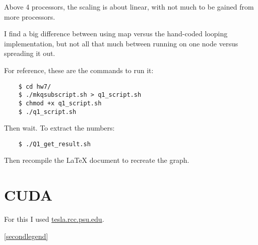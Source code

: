 \documentclass[11pt]{article}
\begin{document}
Above 4 processors, the scaling is about linear, with not much to be gained
from more processors.

I find a big difference between using map versus the hand-coded looping
implementation, but not all that much between running on one node versus
spreading it out.

For reference, these are the commands to run it:
\begin{center}
\begin{verbatim}
    $ cd hw7/
    $ ./mkqsubscript.sh > q1_script.sh
    $ chmod +x q1_script.sh
    $ ./q1_script.sh
\end{verbatim}
\end{center}
Then wait. To extract the numbers:
\begin{center}
\begin{verbatim}
    $ ./Q1_get_result.sh
\end{verbatim}
\end{center}
Then recompile the \LaTeX{} document  to recreate the graph.



\section{CUDA}

For this I used \url{tesla.rcc.psu.edu}.

\begin{center}
  \ref{secondlegend}
\end{center}
\end{document}

